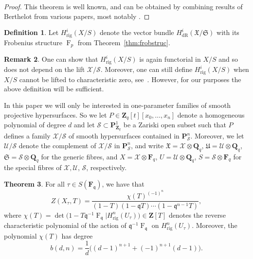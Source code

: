 \documentclass[a4paper,11pt]{article}
\numberwithin{equation}{section}
\newcommand{\ZZ}{\mathbf{Z}} %
\newcommand{\QQ}{\mathbf{Q}} %
\newcommand{\FF}{\mathbf{F}} %
\DeclareMathOperator{\Frob}{F}           %
\providecommand{\HdR}{H_{\text{dR}}}    %
\providecommand{\Hrig}{H_{\text{rig}}}  %
\theoremstyle{definition}
\newtheorem{thm}{Theorem}[section]
\newtheorem{defn}[thm]{Definition}
\newtheorem{rem}[thm]{Remark}
\begin{document}
\begin{proof}
This theorem is well known, and can be obtained by combining results of 
Berthelot from various papers, most notably \cite{Berthelot1986}.   
\end{proof}

\begin{defn}
Let $\Hrig^i(X/S)$ denote the vector bundle $\HdR^i(\mathfrak{X}/\mathfrak{S})$ 
with its Frobenius structure $\Frob_p$ from Theorem~\ref{thm:frobstruc}.
\end{defn}

\begin{rem}
One can show that $\Hrig^i(X/S)$ is again functorial in $X/S$ and so does 
not depend on the lift $\mathcal{X}/\mathcal{S}$. Moreover, one can still 
define $\Hrig^i(X/S)$ when $X/S$ cannot be lifted to characteristic zero, 
see~\cite{Berthelot1986}.  However, for our purposes the above definition 
will be sufficient.
\end{rem}

In this paper we will only be interested in one-parameter families of smooth 
projective hypersurfaces. So we let $P \in \ZZ_q[t][x_0,\ldots,x_n]$ denote 
a homogeneous polynomial of degree $d$ and let 
$\mathcal{S} \subset \mathbf{P}^1_{\ZZ_q}$ be a Zariski open subset such that 
$P$ defines a family $\mathcal{X}/\mathcal{S}$ of smooth hypersurfaces contained 
in $\mathbf{P}^n_{\mathcal{S}}$. Moreover, we let $\mathcal{U}/\mathcal{S}$ 
denote the complement of $\mathcal{X}/\mathcal{S}$ in $\mathbf{P}^n_{\mathcal{S}}$,
and write $\mathfrak{X}=\mathcal{X} \otimes \QQ_q$, 
$\mathfrak{U}=\mathcal{U} \otimes \QQ_q$, $\mathfrak{S}=\mathcal{S} \otimes \QQ_q$
for the generic fibres, and $X=\mathcal{X} \otimes \FF_q$, 
$U=\mathcal{U} \otimes \QQ_q$, $S=\mathcal{S} \otimes \FF_q$ for the special 
fibres of $\mathcal{X},\mathcal{U}$, $\mathcal{S}$, respectively.

\begin{thm} \label{thm:hypersurface} 
For all $\tau \in S(\FF_{\mathfrak{q}})$, we have that
\begin{equation} \label{eq:formulazeta}
Z(X_{\tau},T) = \frac{\chi(T)^{(-1)^n}}{(1 - T) (1 - \mathfrak{q}T) \dotsm (1 - \mathfrak{q}^{n-1}T)},
\end{equation}
where 
$\chi(T) = \det \bigl( 1 - T \mathfrak{q}^{-1} \Frob_{\mathfrak{q}} | \Hrig^n(U_{\tau}) \bigr) \in \ZZ[T]$
denotes the reverse characteristic polynomial of the action of 
$\mathfrak{q}^{-1} \Frob_{\mathfrak{q}}$ on $\Hrig^n(U_{\tau})$. 
Moreover, the polynomial $\chi(T)$ has degree 
\begin{equation} \label{eq:formulab}
b(d,n) = \frac{1}{d} \bigl((d-1)^{n+1} + (-1)^{n+1}(d-1) \bigr).
\end{equation}
\end{thm}
\end{document}
